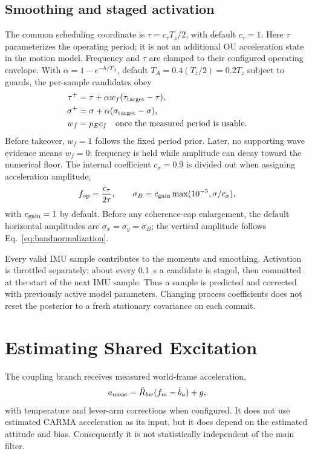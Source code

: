 \documentclass[conference]{IEEEtran}
\newcommand{\vc}[1]{\bm{#1}}
\newcommand{\mt}[1]{\bm{#1}}
\begin{document}
\subsection{Smoothing and staged activation}
The common scheduling coordinate is $\tau=c_\tau T_z/2$, with default
$c_\tau=1$. Here $\tau$ parameterizes the operating period; it is not an
additional OU acceleration state in the motion model. Frequency and
$\tau$ are clamped to their configured operating envelope. With
$\alpha=1-e^{-h/T_A}$, default $T_A=0.4(T_z/2)=0.2T_z$ subject to guards,
the per-sample candidates obey
\begin{align}
 \tau^+&=\tau+\alpha w_f(\tau_{\rm target}-\tau),\nonumber\\
 \sigma^+&=\sigma+\alpha(\sigma_{\rm target}-\sigma),\label{eq:ema}\\
 w_f&=p_Ec_f\quad\text{once the measured period is usable}.\nonumber
\end{align}
Before takeover, $w_f=1$ follows the fixed period prior. Later, no
supporting wave evidence means $w_f=0$: frequency is held while amplitude
can decay toward the numerical floor. The internal coefficient
$c_\sigma=0.9$ is divided out when assigning acceleration amplitude,
\begin{equation}
 f_{\rm op}=\frac{c_\tau}{2\tau},\qquad
 \sigma_B=c_{\rm gain}\max(10^{-5},\sigma/c_\sigma),
 \label{eq:operatingpoint}
\end{equation}
with $c_{\rm gain}=1$ by default. Before any coherence-cap enlargement,
the default horizontal amplitudes are $\sigma_x=\sigma_y=\sigma_B$;
the vertical amplitude follows Eq.~\eqref{eq:bandnormalization}.

Every valid IMU sample contributes to the moments and smoothing.
Activation is throttled separately: about every 0.1~s a candidate is
staged, then committed at the start of the next IMU sample. Thus a sample
is predicted and corrected with previously active model parameters.
Changing process coefficients does not reset the posterior to a fresh
stationary covariance on each commit.

\section{Estimating Shared Excitation}
\label{sec:crossestimate}
The coupling branch receives measured world-frame acceleration,
\begin{equation}
 \vc a_{\rm meas}=\hat{\mt R}_{bw}(\vc f_m-\hat{\vc b}_a)+\vc g,
 \label{eq:ameas}
\end{equation}
with temperature and lever-arm corrections when configured. It does not
use estimated CARMA acceleration as its input, but it does depend on the
estimated attitude and bias. Consequently it is not statistically
independent of the main filter.
\end{document}
